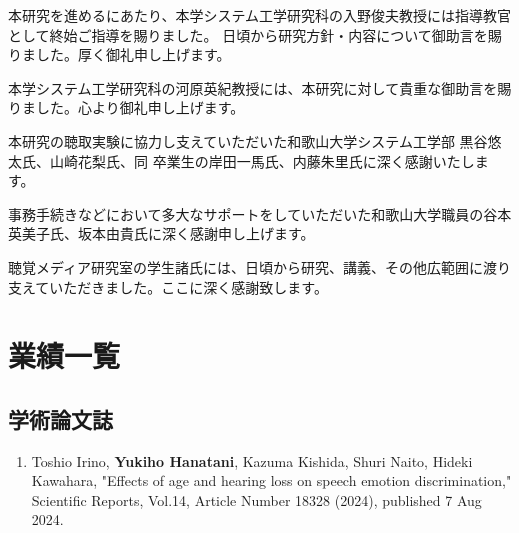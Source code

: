 \documentclass[11pt]{jreport}
\begin{document}
\begin{acknowledgements}
本研究を進めるにあたり、本学システム工学研究科の入野俊夫教授には指導教官として終始ご指導を賜りました。
日頃から研究方針・内容について御助言を賜りました。厚く御礼申し上げます。

本学システム工学研究科の河原英紀教授には、本研究に対して貴重な御助言を賜りました。心より御礼申し上げます。

本研究の聴取実験に協力し支えていただいた和歌山大学システム工学部 黒谷悠太氏、山崎花梨氏、同 卒業生の岸田一馬氏、内藤朱里氏に深く感謝いたします。

事務手続きなどにおいて多大なサポートをしていただいた和歌山大学職員の谷本英美子氏、坂本由貴氏に深く感謝申し上げます。

聴覚メディア研究室の学生諸氏には、日頃から研究、講義、その他広範囲に渡り支えていただきました。ここに深く感謝致します。
\end{acknowledgements}



% 





\appendix


\newpage
\section*{業績一覧}
\subsection*{学術論文誌}
 \begin{enumerate}

    \item  Toshio Irino, \textbf{Yukiho Hanatani}, Kazuma Kishida, Shuri Naito, Hideki Kawahara,
     "Effects of age and hearing loss on speech emotion discrimination," Scientific Reports, 
     Vol.14, Article Number 18328 (2024), published 7 Aug 2024.

\end{enumerate}
\end{document}
